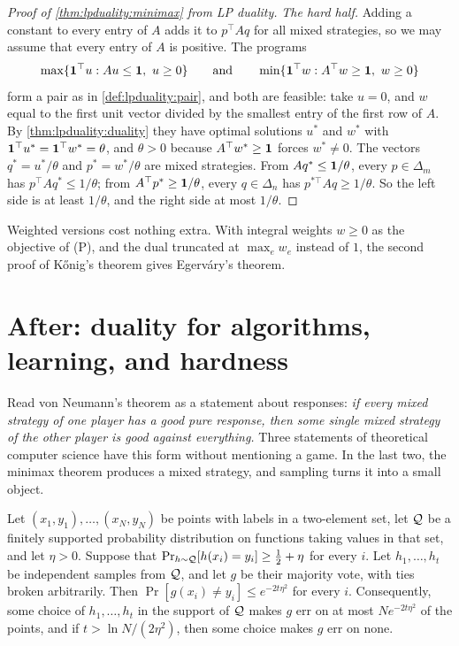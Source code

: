 \begin{refsection}
\begin{proof}[Proof of \cref{thm:lpduality:minimax} from LP duality]
\emph{The hard half.} Adding a constant to every entry of $A$ adds it to $p^\top Aq$ for all mixed strategies, so we may assume that every entry of $A$ is positive. The programs
\[
\max\{\mathbf{1}^\top u: Au\le\mathbf{1},\ u\ge0\}\qquad\text{and}\qquad\min\{\mathbf{1}^\top w: A^\top w\ge\mathbf{1},\ w\ge0\}
\]
form a pair as in \cref{def:lpduality:pair}, and both are feasible: take $u=0$, and $w$ equal to the first unit vector divided by the smallest entry of the first row of $A$. By \cref{thm:lpduality:duality} they have optimal solutions $u^*$ and $w^*$ with $\mathbf{1}^\top u^*=\mathbf{1}^\top w^*=\theta$, and $\theta>0$ because $A^\top w^*\ge\mathbf{1}$ forces $w^*\ne0$. The vectors $q^*=u^*/\theta$ and $p^*=w^*/\theta$ are mixed strategies. From $Aq^*\le\mathbf{1}/\theta$, every $p\in\Delta_m$ has $p^\top Aq^*\le1/\theta$; from $A^\top p^*\ge\mathbf{1}/\theta$, every $q\in\Delta_n$ has $p^{*\top}Aq\ge1/\theta$. So the left side is at least $1/\theta$, and the right side at most $1/\theta$.
\end{proof}

Weighted versions cost nothing extra. With integral weights $w\ge0$ as the objective of (P), and the dual truncated at $\max_ew_e$ instead of $1$, the second proof of K\H{o}nig's theorem gives Egerv\'ary's theorem.

\section{After: duality for algorithms, learning, and hardness}\label{sec:lpduality:reach}

Read von Neumann's theorem as a statement about responses: \emph{if every mixed strategy of one player has a good pure response, then some single mixed strategy of the other player is good against everything.} Three statements of theoretical computer science have this form without mentioning a game. In the last two, the minimax theorem produces a mixed strategy, and sampling turns it into a small object.

\begin{lemma}\label{lem:lpduality:sampling}
Let $(x_1,y_1),\dots,(x_N,y_N)$ be points with labels in a two-element set, let $\mathcal{Q}$ be a finitely supported probability distribution on functions taking values in that set, and let $\eta>0$. Suppose that $\Pr_{h\sim\mathcal{Q}}[h(x_i)=y_i]\ge\frac12+\eta$ for every $i$. Let $h_1,\dots,h_t$ be independent samples from $\mathcal{Q}$, and let $g$ be their majority vote, with ties broken arbitrarily. Then $\Pr[g(x_i)\ne y_i]\le e^{-2t\eta^2}$ for every $i$. Consequently, some choice of $h_1,\dots,h_t$ in the support of $\mathcal{Q}$ makes $g$ err on at most $Ne^{-2t\eta^2}$ of the points, and if $t>\ln N/(2\eta^2)$, then some choice makes $g$ err on none.
\end{lemma}


\end{refsection}
